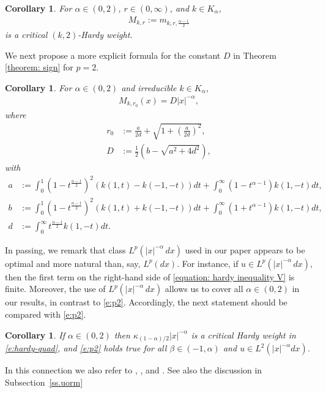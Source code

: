 \documentclass[12pt, a4paper]{amsart}
\newtheorem{corollary}[theorem]{Corollary}
\begin{document}
\begin{corollary}
\label{corollary: case p = 2 critical weight}
For $\alpha \in (0, 2)$, $r \in (0, \infty)$, and $k \in K_\alpha$,
\begin{align*}
    M_{k, r} := m_{k, r, \frac{\alpha - 1}{2}}
\end{align*}
is a critical $(k, 2)$-Hardy weight.
    
\end{corollary}
We next propose a more explicit formula for the constant $D$ in Theorem \cref{theorem: sign} for $p=2$.
\begin{corollary}
\label{corollary: case p = 2 constant}
For $\alpha \in (0, 2)$ and irreducible $k \in K_\alpha$,
\begin{align*}
    M_{k, r_0}(x) = D|x|^{-\alpha},
\end{align*}
where
\begin{align*}
    r_0 &:= \frac{a}{2d} + \sqrt{1 + \left(\frac{a}{2d}\right)^2},
    \\
    D &:= \frac{1}{2}\left(b - \sqrt{a^2 + 4d^2} \right),
\end{align*}
with
\begin{align*}
    a &:= \int_{0}^{1}\left(1-t^{\frac{\alpha-1}{2}}\right)^2(k(1, t) - k(-1, -t))dt + \int_{0}^{\infty}(1-t^{\alpha-1})k(1, -t)dt,
    \\
    b &:= \int_{0}^{1}\left(1-t^{\frac{\alpha-1}{2}}\right)^2(k(1, t) + k(-1, -t))dt + \int_{0}^{\infty}(1 + t^{\alpha-1})k(1, -t)dt,
    \\
    d &:=\int_{0}^{\infty}t^{\frac{\alpha-1}{2}}k(1, -t)dt.
\end{align*}
\end{corollary}
In passing, we remark that
class \(L^p(|x|^{-\alpha}\,dx)\) used in our paper
appears to be optimal 
and more natural than, say, \(L^p(dx)\). 
For instance, if \(u \in L^p(|x|^{-\alpha}\,dx)\), then the first term on the right-hand side 
of \eqref{equation: hardy inequality V} is finite. 
Moreover, the use of \(L^p(|x|^{-\alpha}\,dx)\) allows us to cover all \(\alpha \in (0,2)\) 
in our results, in contrast to \eqref{e:p2}. 
Accordingly, the next statement should be compared with \eqref{e:p2}.

\begin{corollary}\label{c.La2}
If $\alpha \in (0, 2)$ then
$\kappa_{(1-\alpha)/2}|x|^{-\alpha}$ is a critical Hardy weight in \eqref{e:hardy-quad}, and \eqref{e:p2} holds true for all
$\beta \in (-1, \alpha)$
and
$u \in L^2(|x|^{-\alpha}dx)$.
\end{corollary}
 In this connection we also refer to
 \cite[Proposition 5]{MR3460023},
\cite[Subsection 3.1]{MR1717839}, and 
\cite[Theorem 1.2.1, Proposition 5.3.7, and Proposition 5.3.9]{BogdanFafulaSztonyk2025}. See also the discussion in Subsection~\ref{ss.uorm}
\end{document}
